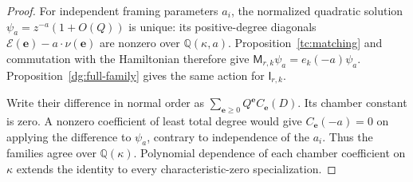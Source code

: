 \documentclass[11pt]{amsart}
\theoremstyle{definition}
\theoremstyle{remark}
\numberwithin{equation}{section}
\newcommand{\Q}{\mathbb Q}
\begin{document}
\begin{proof}
For independent framing parameters $a_i$, the normalized quadratic
solution $\psi_a=z^{-a}(1+O(Q))$ is unique: its positive-degree
diagonals $\mathcal E(\boldsymbol e)-a\cdot\nu(\boldsymbol e)$
are nonzero over $\Q(\kappa,a)$.
Proposition~\ref{tc:matching} and commutation with the Hamiltonian
therefore give $\mathsf M_{r,k}\psi_a=e_k(-a)\psi_a$.
Proposition~\ref{dg:full-family} gives the same action for
$\mathsf I_{r,k}$.

Write their difference in normal order as
$\sum_{\boldsymbol e\geq0}Q^{\boldsymbol e}C_{\boldsymbol e}(D)$.
Its chamber constant is zero. A nonzero coefficient of least
total degree would give $C_{\boldsymbol e}(-a)=0$ on applying
the difference to $\psi_a$, contrary to independence of the
$a_i$. Thus the families agree over $\Q(\kappa)$.
Polynomial dependence of each chamber coefficient on $\kappa$
extends the identity to every characteristic-zero specialization.
\end{proof}
\end{document}
